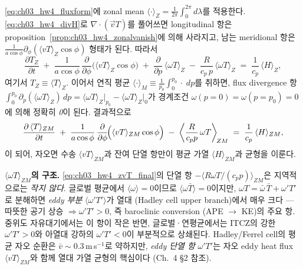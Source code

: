 \begin{example}
\label{ex:ch03_hw4_zvT}
\eqref{eq:ch03_hw4_fluxform}에 zonal mean $\langle\cdot\rangle_{Z} = \frac{1}{2\pi}\!\int_{0}^{2\pi}\!d\lambda$를 적용한다.
\eqref{eq:ch03_hw4_divH}로 $\nabla\!\cdot(\vec v T)$를 풀어쓰면 longitudinal 항은
proposition~\ref{prop:ch03_hw4_zonalvanish}에 의해 사라지고, 남는 meridional 항은
$\frac{1}{a\cos\phi}\partial_{\phi}(\langle vT\rangle_{Z}\cos\phi)$ 형태가 된다.  따라서
\begin{equation}
  \frac{\partial T_{Z}}{\partial t}
     \;+\; \frac{1}{a\cos\phi}\,\frac{\partial}{\partial\phi}\!\bigl(\langle vT\rangle_{Z}\cos\phi\bigr)
     \;+\; \frac{\partial}{\partial p}\,\langle\omega T\rangle_{Z}
     \;-\; \frac{R}{c_{p}\,p}\,\langle\omega T\rangle_{Z}
     \;=\; \frac{1}{c_{p}}\,\langle H\rangle_{Z},
  \label{eq:ch03_hw4_zvT_main}
\end{equation}
여기서 $T_{Z} \equiv \langle T\rangle_{Z}$.  이어서 연직 평균
$\langle\cdot\rangle_{M} \equiv \frac{1}{p_{0}}\!\int_{0}^{p_{0}}\!\cdot\;dp$를 취하면,
flux divergence 항 $\int_{0}^{p_{0}}\partial_{p}(\langle\omega T\rangle_{Z})\,dp
= \langle\omega T\rangle_{Z}\!\bigl|_{p_{0}} - \langle\omega T\rangle_{Z}\!\bigl|_{0}$가
경계조건 $\omega(p=0) = \omega(p=p_{0}) = 0$에 의해 정확히 \emph{0}이 된다.  결과적으로
\begin{equation}
  \frac{\partial\,\langle T\rangle_{ZM}}{\partial t}
     \;+\; \frac{1}{a\cos\phi}\,\frac{\partial}{\partial\phi}\!\Bigl(\langle vT\rangle_{ZM}\cos\phi\Bigr)
     \;-\; \biggl\langle\frac{R}{c_{p}p}\,\omega T\biggr\rangle_{\!ZM}
     \;=\; \frac{1}{c_{p}}\,\langle H\rangle_{ZM},
  \label{eq:ch03_hw4_zvT_final}
\end{equation}
이 되어, 자오면 수송 $\langle vT\rangle_{ZM}$과 잔여 단열 항만이 평균 가열 $\langle H\rangle_{ZM}$과 균형을 이룬다.
\end{example}

\begin{hisublock}
\textbf{$\langle\omega T\rangle_{ZM}$의 구조.}
\eqref{eq:ch03_hw4_zvT_final}의 단열 항 $-\langle R\omega T/(c_{p}p)\rangle_{ZM}$은 지역적으로는
\emph{작지 않다}.  글로벌 평균에서 $\langle\omega\rangle = 0$이므로 $\langle\omega\bar T\rangle = 0$이지만,
$\omega T = \bar\omega\,\bar T + \omega' T'$로 분해하면 \emph{eddy 부분} $\langle\omega' T'\rangle$가
열대 (Hadley cell upper branch)에서 매우 크다 --- 따뜻한 공기 상승 $\Rightarrow \omega' T' > 0$,
즉 baroclinic conversion (APE $\to$ KE)의 주요 항.  중위도 자유대기에서는 이 항이 작은 반면,
글로벌·연평균에서는 ITCZ의 강한 $\omega'T' > 0$와 아열대 강하의 $\omega'T' < 0$이 부분적으로
상쇄된다.  Hadley/Ferrel cell의 평균 자오 순환은 $\bar v \sim 0.3$\,m\,s$^{-1}$로 약하지만,
\emph{eddy 단열 항} $\omega' T'$는 자오 eddy heat flux $\langle vT\rangle_{ZM}$와 함께
열대 가열 균형의 핵심이다 (Ch.~4 \S2 참조).
\end{hisublock}


